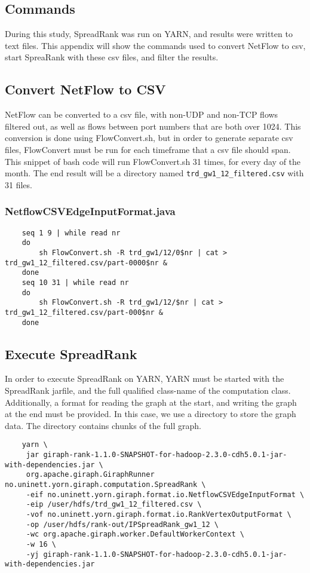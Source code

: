 \begin{landscape}
\chapter{Commands}

During this study,
SpreadRank was run on YARN, and results were written to text files.
This appendix will show the commands used to convert NetFlow to \gls{csv},
 start SpreaRank with these \gls{csv} files,
 and filter the results.

\section{Convert NetFlow to CSV}
NetFlow can be converted to a \gls{csv} file, with non-UDP and non-TCP flows filtered out, as well as flows between port numbers that are both over 1024.
This conversion is done using FlowConvert.sh, but in order to generate separate \gls{csv} files, FlowConvert must be run for each timeframe that a \gls{csv} file should span.
This snippet of \gls{bash} code will run FlowConvert.sh 31 times, for every day of the month.
The end result will be a directory named \verb"trd_gw1_12_filtered.csv" with 31 files.

\subsection{NetflowCSVEdgeInputFormat.java}
\begin{verbatim}
	seq 1 9 | while read nr
	do
	    sh FlowConvert.sh -R trd_gw1/12/0$nr | cat > trd_gw1_12_filtered.csv/part-0000$nr &
	done
	seq 10 31 | while read nr
	do
	    sh FlowConvert.sh -R trd_gw1/12/$nr | cat > trd_gw1_12_filtered.csv/part-000$nr &
	done
\end{verbatim}

\section{Execute SpreadRank}
In order to execute SpreadRank on YARN,
 YARN must be started with the SpreadRank jarfile,
 and the full qualified class-name of the computation class.
Additionally, a format for reading the graph at the start, and writing the graph at the end must be provided.
In this case, we use a directory to store the graph data.
The directory contains chunks of the full graph.

\begin{verbatim}
	yarn \
	 jar giraph-rank-1.1.0-SNAPSHOT-for-hadoop-2.3.0-cdh5.0.1-jar-with-dependencies.jar \
	 org.apache.giraph.GiraphRunner no.uninett.yorn.giraph.computation.SpreadRank \
	 -eif no.uninett.yorn.giraph.format.io.NetflowCSVEdgeInputFormat \
	 -eip /user/hdfs/trd_gw1_12_filtered.csv \
	 -vof no.uninett.yorn.giraph.format.io.RankVertexOutputFormat \
	 -op /user/hdfs/rank-out/IPSpreadRank_gw1_12 \
	 -wc org.apache.giraph.worker.DefaultWorkerContext \
	 -w 16 \
	 -yj giraph-rank-1.1.0-SNAPSHOT-for-hadoop-2.3.0-cdh5.0.1-jar-with-dependencies.jar
\end{verbatim}


\end{landscape}
